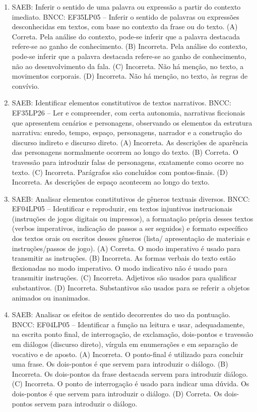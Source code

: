 \begin{enumerate}
\item
SAEB: Inferir o sentido de uma palavra ou expressão a partir do contexto imediato. BNCC: EF35LP05 -- Inferir o sentido de palavras ou expressões desconhecidas em textos, com base no contexto da frase ou do texto. 
(A) Correta. Pela análise do contexto, pode-se inferir que a palavra destacada refere-se ao ganho de conhecimento. 
(B) Incorreta. Pela análise do contexto, pode-se inferir que a palavra destacada refere-se ao ganho de conhecimento, não ao desenvolvimento da fala. 
(C) Incorreta. Não há menção, no texto, a movimentos corporais. 
(D) Incorreta. Não há menção, no texto, às regras de convívio.

\item
SAEB: Identificar elementos constitutivos de textos narrativos. BNCC: EF35LP26 -- Ler e compreender, com certa autonomia, narrativas ficcionais que apresentem cenários e personagens, observando os elementos da estrutura narrativa: enredo, tempo, espaço, personagens, narrador e a construção do discurso indireto e discurso direto. 
(A) Incorreta. As descrições de aparência das personagens normalmente ocorrem ao longo do texto. 
(B) Correta. O travessão para introduzir falas de personagens, exatamente como ocorre no texto. 
(C) Incorreta. Parágrafos são concluídos com pontos-finais. 
(D) Incorreta. As descrições de espaço acontecem ao longo do texto.

\item
SAEB: Analisar elementos constitutivos de gêneros textuais diversos. BNCC: EF04LP05 -- Identificar e reproduzir, em textos injuntivos instrucionais (instruções de jogos digitais ou impressos), a formatação própria desses textos (verbos imperativos, indicação de passos a ser seguidos) e formato específico dos textos orais ou escritos desses gêneros (lista/ apresentação de materiais e instruções/passos de jogo). 
(A) Correta. O modo imperativo é usado para transmitir as instruções. 
(B) Incorreta. As formas verbais do texto estão flexionadas no modo imperativo. O modo indicativo não é usado para transmitir instruções. 
(C) Incorreta. Adjetivos são usados para qualificar substantivos. 
(D) Incorreta. Substantivos são usados para se referir a objetos animados ou inanimados.

\item
SAEB: Analisar os efeitos de sentido decorrentes do uso da pontuação. BNCC: EF04LP05 -- Identificar a função na leitura e usar, adequadamente, na escrita ponto final, de interrogação, de exclamação, dois-pontos e travessão em diálogos (discurso direto), vírgula em enumerações e em separação de vocativo e de aposto. 
(A) Incorreta. O ponto-final é utilizado para concluir uma frase. Os dois-pontos é que servem para introduzir o diálogo. 
(B) Incorreta. Os dois-pontos da frase destacada servem para introduzir diálogo. 
(C) Incorreta. O ponto de interrogação é usado para indicar uma dúvida. Os dois-pontos é que servem para introduzir o diálogo. 
(D) Correta. Os dois-pontos servem para introduzir o diálogo.


\end{enumerate}
